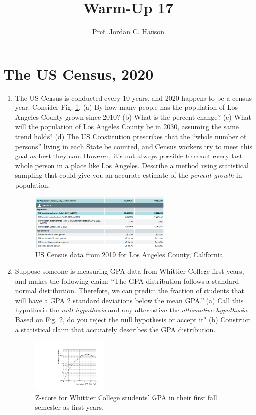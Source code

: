 \documentclass{article}
\begin{document}
\title{Warm-Up 17}
\author{Prof. Jordan C. Hanson}

\maketitle

\section{The US Census, 2020}

\begin{enumerate}
\item The US Census is conducted every 10 years, and 2020 happens to be a census year.  Consider Fig. \ref{fig:population}.  (a) By how many people has the population of Los Angeles County grown since 2010?  (b) What is the percent change?  (c) What will the population of Los Angeles County be in 2030, assuming the same trend holds?  (d) The US Constitution prescribes that the ``whole number of persons'' living in each State be counted, and Census workers try to meet this goal as best they can.  However, it's not always possible to count every last whole person in a place like Los Angeles.  Describe a method using statistical sampling that could give you an accurate estimate of the \textit{percent growth} in population.
\begin{figure}[ht]
\centering
\includegraphics[width=0.65\textwidth]{population.png}
\caption{\label{fig:population} US Census data from 2019 for Los Angeles County, California.}
\end{figure}
\item Suppose someone is measuring GPA data from Whittier College first-years, and makes the following claim: ``The GPA distribution follows a standard-normal distribution.  Therefore, we can predict the fraction of students that will have a GPA 2 standard deviations below the mean GPA.''  (a) Call this hypothesis the \textit{null hypothesis} and any alternative the \textit{alternative hypothesis.}  Based on Fig. \ref{fig:gpa}, do you reject the null hypothesis or accept it?  (b) Construct a statistical claim that accurately describes the GPA distribution.
\begin{figure}[hb]
\centering
\includegraphics[width=0.35\textwidth]{Nov15_plot3.pdf}
\caption{\label{fig:gpa} Z-score for Whittier College students' GPA in their first fall semester as first-years.}
\end{figure}
\end{enumerate}
\end{document}
